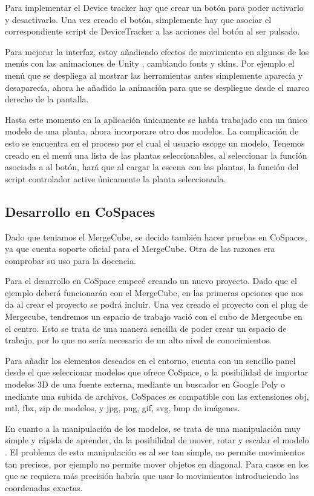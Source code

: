 Para implementar el Device tracker hay que crear un botón para poder activarlo y desactivarlo. Una vez creado el botón, simplemente hay que asociar el correspondiente script de DeviceTracker a las acciones del botón al ser pulsado.


Para mejorar la interfaz, estoy añadiendo efectos de movimiento en algunos de los menús con las animaciones de Unity , cambiando fonts y skins. Por ejemplo el menú que se despliega al mostrar las herramientas antes simplemente aparecía y desaparecía, ahora he añadido la animación para que se despliegue desde el marco derecho de la pantalla.


Hasta este momento en la aplicación únicamente se había trabajado con un único modelo de una planta, ahora incorporare otro dos modelos.  La complicación de esto se encuentra en el proceso por el cual el usuario escoge un modelo. Tenemos creado en el menú una lista de las plantas seleccionables, al seleccionar la función asociada a al botón, hará que al cargar la escena con las plantas, la función del script controlador active únicamente la planta seleccionada.



\subsection{Desarrollo en CoSpaces}
Dado que teniamos el MergeCube, se decido también hacer pruebas en CoSpaces, ya que cuenta soporte oficial para el MergeCube. Otra de las razones era comprobar su uso para la docencia.

Para el desarrollo en CoSpace empecé creando un nuevo proyecto. Dado que el ejemplo deberá funcionarán con el MergeCube, en las primeras opciones que nos da al crear el proyecto se podrá incluir.
Una vez creado el proyecto con el plug de Mergecube, tendremos un espacio de trabajo vació con el cubo de Mergecube en el centro. Esto se trata de una manera sencilla de poder crear un espacio de trabajo, por lo que no sería necesario de un alto nivel de conocimientos.

Para añadir los elementos deseados en el entorno, cuenta con un sencillo panel desde el que seleccionar modelos que ofrece CoSpace, o la posibilidad de importar modelos 3D de una fuente externa, mediante un buscador en Google Poly o mediante una subida de archivos. CoSpaces es compatible con las extensiones obj, mtl, fbx, zip de modelos, y jpg, png, gif, svg, bmp de imágenes.

En cuanto a la manipulación de los modelos, se trata de una manipulación muy simple y rápida de aprender, da la posibilidad de mover, rotar y escalar el modelo . El problema de esta manipulación es al ser tan simple, no permite movimientos tan precisos, por ejemplo no permite mover objetos en diagonal. Para casos en los que se requiera más precisión habría que usar lo movimientos introduciendo las coordenadas exactas.

